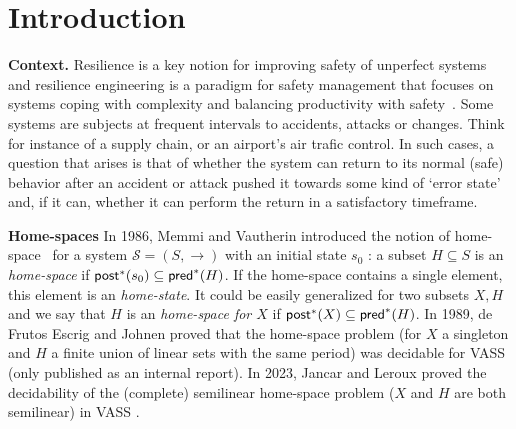 \section{Introduction}\label{section introduction}


{\bf Context.} 
Resilience is a key notion for improving safety of unperfect systems and resilience engineering is a paradigm for safety management that focuses on systems coping with complexity and balancing productivity with safety~\cite{challenges}. Some systems are subjects at frequent intervals to accidents, attacks or changes. Think for instance of a supply chain, or an airport’s air trafic control. In such cases, a question that arises is that of whether the system can return to its normal (safe) behavior after an accident or attack
pushed it towards some kind of ‘error state’ and, if it can, whether it can perform the return in a satisfactory timeframe. 
%


{\bf Home-spaces}
 In 1986, Memmi and Vautherin introduced the notion of home-space~\cite{DBLP:conf/ac/MemmiV86} for a system $\mathscr{S} = (S,\rightarrow )$ with an initial state $s_0$ : a subset $H \subseteq S$ is an \emph{home-space}  if 
$\textsf{post}^*(s_0) \subseteq \textsf{pred}^*(H)$. If the home-space contains a single element, this element is an {\em home-state}.
It could be easily generalized for two subsets $X,H$ and we say that $H$ is an \emph{home-space for $X$} if $\textsf{post}^*(X) \subseteq \textsf{pred}^*(H)$. In 1989, de Frutos Escrig and Johnen proved that the home-space problem (for $X$ a singleton and $H$ a finite union of linear sets with the same period) was decidable for VASS (only published as an internal report). In 2023, Jancar and Leroux proved the decidability of the (complete) semilinear home-space problem ($X$ and $H$ are both semilinear)  in VASS \cite{DBLP:journals/corr/abs-2207-02697}.

